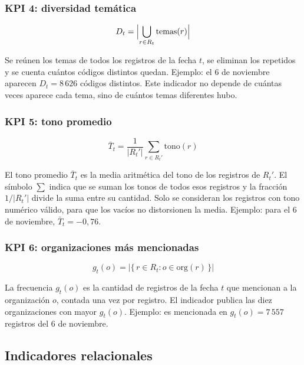 \documentclass[11pt,a4paper]{article}
\newcommand{\code}[1]{\detokenize{#1}}
\begin{document}
\subsubsection{KPI 4: diversidad temática}

\begin{equation*}
D_t = \Bigl\lvert \bigcup_{r \in R_t} \mathrm{temas}(r) \Bigr\rvert
\end{equation*}

Se reúnen los temas de todos los registros de la fecha $t$, se eliminan los repetidos y se cuenta cuántos códigos distintos quedan. Ejemplo: el 6 de noviembre aparecen $D_t = 8\,626$ códigos distintos. Este indicador no depende de cuántas veces aparece cada tema, sino de cuántos temas diferentes hubo.

\subsubsection{KPI 5: tono promedio}

\begin{equation*}
\bar{T}_t = \frac{1}{\lvert R_t' \rvert} \sum_{r \in R_t'} \mathrm{tono}(r)
\end{equation*}

El tono promedio $\bar{T}_t$ es la media aritmética del tono de los registros de $R_t'$. El símbolo $\sum$ indica que se suman los tonos de todos esos registros y la fracción $1/\lvert R_t' \rvert$ divide la suma entre su cantidad. Solo se consideran los registros con tono numérico válido, para que los vacíos no distorsionen la media. Ejemplo: para el 6 de noviembre, $\bar{T}_t = -0{,}76$.

\subsubsection{KPI 6: organizaciones más mencionadas}

\begin{equation*}
g_t(o) = \bigl\lvert \{\, r \in R_t : o \in \mathrm{org}(r) \,\} \bigr\rvert
\end{equation*}

La frecuencia $g_t(o)$ es la cantidad de registros de la fecha $t$ que mencionan a la organización $o$, contada una vez por registro. El indicador publica las diez organizaciones con mayor $g_t(o)$. Ejemplo: \code{united states} es mencionada en $g_t(o) = 7\,557$ registros del 6 de noviembre.

\subsection{Indicadores relacionales}
\end{document}
